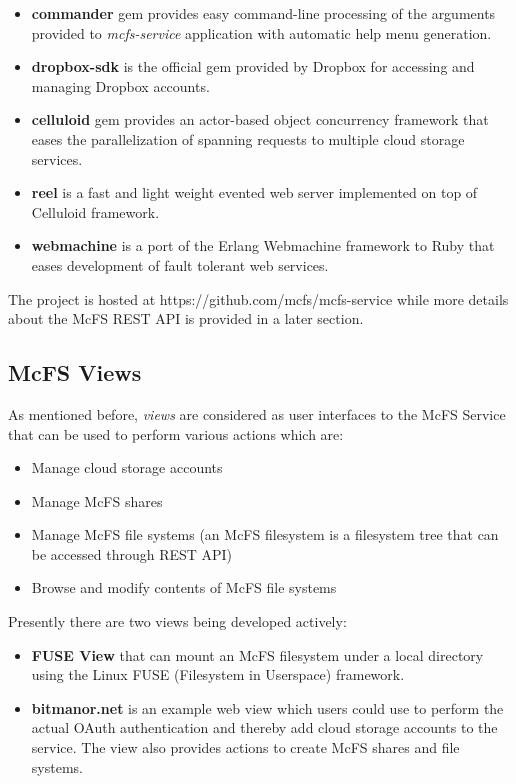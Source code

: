 \begin{itemize}
	\item \textbf{commander} gem provides easy command-line processing of the arguments provided to \textit{mcfs-service} application with automatic help menu generation.
	\item \textbf{dropbox-sdk} is the official gem provided by Dropbox for accessing and managing Dropbox accounts.
	\item \textbf{celluloid} gem provides an actor-based object concurrency framework that eases the parallelization of spanning requests to multiple cloud storage services.
	\item \textbf{reel} is a fast and light weight evented web server implemented on top of Celluloid framework.
	\item \textbf{webmachine} is a port of the Erlang Webmachine framework to Ruby that eases development of fault tolerant web services.
\end{itemize}

The project is hosted at https://github.com/mcfs/mcfs-service while more details about the McFS REST API is provided in a later section.

\subsection{McFS Views}
As mentioned before, \textit{views} are considered as user interfaces to the McFS Service that can be used to perform various actions which are:

\begin{itemize}
	\item Manage cloud storage accounts
	\item Manage McFS shares
	\item Manage McFS file systems (an McFS filesystem is a filesystem tree that can be accessed through REST API)
	\item Browse and modify contents of McFS file systems
\end{itemize}

Presently there are two views being developed actively:

\begin{itemize}
	\item \textbf{FUSE View} that can mount an McFS filesystem under a local directory using the Linux FUSE (Filesystem in Userspace)\cite{site:fuselinux} \cite{site:osxfuse} framework.
	\item \textbf{bitmanor.net} is an example web view which users could use to perform the actual OAuth authentication and thereby add cloud storage accounts to the service. The view also provides actions to create McFS shares and file systems.
\end{itemize}

